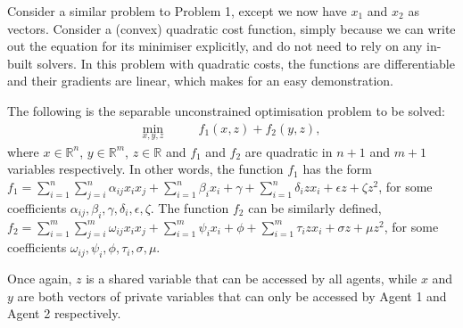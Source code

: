 \documentclass[12pt]{article}
\begin{document}
Consider a similar problem to Problem 1, except we now have $x_1$ and $x_2$ as vectors. Consider a (convex) quadratic cost function, simply because we can write out the equation for its minimiser explicitly, and do not need to rely on any in-built solvers. In this problem with quadratic costs, the functions are differentiable and their gradients are linear, which makes for an easy demonstration.

The following is the separable unconstrained optimisation problem to be solved:
\begin{align*}
\min_{x,y,z}\qquad& f_1(x,z)+f_2(y,z),
\end{align*}
where $x\in\mathbb{R}^n$, $y\in\mathbb{R}^m$, $z\in\mathbb{R}$ and $f_1$ and $f_2$ are quadratic in $n+1$ and $m+1$ variables respectively. In other words, the function $f_1$ has the form $f_1=\sum\limits_{i=1}^n \sum\limits_{j=i}^n \alpha_{ij}x_ix_j + \sum\limits_{i=1}^n \beta_ix_i+\gamma+\sum\limits_{i=1}^n \delta_izx_i+\epsilon z+\zeta z^2$, for some coefficients $\alpha_{ij},\beta_i,\gamma,\delta_i,\epsilon,\zeta$. The function $f_2$ can be similarly defined, $f_2=\sum\limits_{i=1}^m \sum\limits_{j=i}^m \omega_{ij}x_ix_j + \sum\limits_{i=1}^m \psi_ix_i+\phi+\sum\limits_{i=1}^m \tau_izx_i+\sigma z+\mu z^2$, for some coefficients $\omega_{ij},\psi_i,\phi,\tau_i,\sigma,\mu$.

Once again, $z$ is a shared variable that can be accessed by all agents, while $x$ and $y$ are both vectors of private variables that can only be accessed by Agent 1 and Agent 2 respectively.
\end{document}
